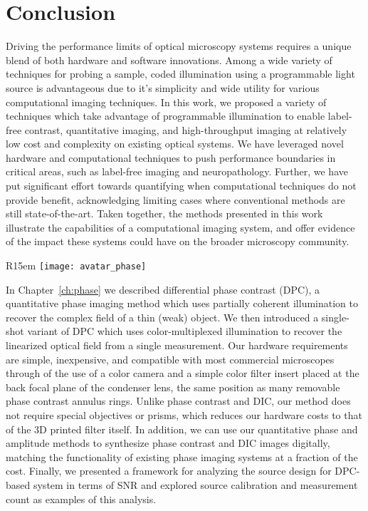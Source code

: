 \chapter{Conclusion}\label{ch:conclusion}
Driving the performance limits of optical microscopy systems requires a unique blend of both hardware and software innovations. Among a wide variety of techniques for probing a sample, coded illumination using a programmable light source is advantageous due to it's simplicity and wide utility for various computational imaging techniques. In this work, we proposed a variety of techniques which take advantage of programmable illumination to enable label-free contrast, quantitative imaging, and high-throughput imaging at relatively low cost and complexity on existing optical systems. We have leveraged novel hardware and computational techniques to push performance boundaries in critical areas, such as label-free imaging and neuropathology. Further, we have put significant effort towards quantifying when computational techniques do not provide benefit, acknowledging limiting cases where conventional methods are still state-of-the-art. Taken together, the methods presented in this work illustrate the capabilities of a computational imaging system, and offer evidence of the impact these systems could have on the broader microscopy community.

\begin{wrapfigure}{R}{15em}
  \texttt{[image: avatar\_phase]}
\end{wrapfigure}

In Chapter~\ref{ch:phase} we described differential phase contrast (DPC), a quantitative phase imaging method which uses partially coherent illumination to recover the complex field of a thin (weak) object. We then introduced a single-shot variant of DPC which uses  color-multiplexed illumination to recover the linearized optical field from a single measurement. Our hardware requirements are simple, inexpensive, and compatible with most commercial microscopes through of the use of a color camera and a simple color filter insert placed at the back focal plane of the condenser lens, the same position as many removable phase contrast annulus rings. Unlike phase contrast and DIC, our method does not require special objectives or prisms, which reduces our hardware costs to that of the 3D printed filter itself. In addition, we can use our quantitative phase and amplitude methods to synthesize phase contrast and DIC images digitally, matching the functionality of existing phase imaging systems at a fraction of the cost. Finally, we presented a framework for analyzing the source design for DPC-based system in terms of SNR and explored source calibration and measurement count as examples of this analysis.


